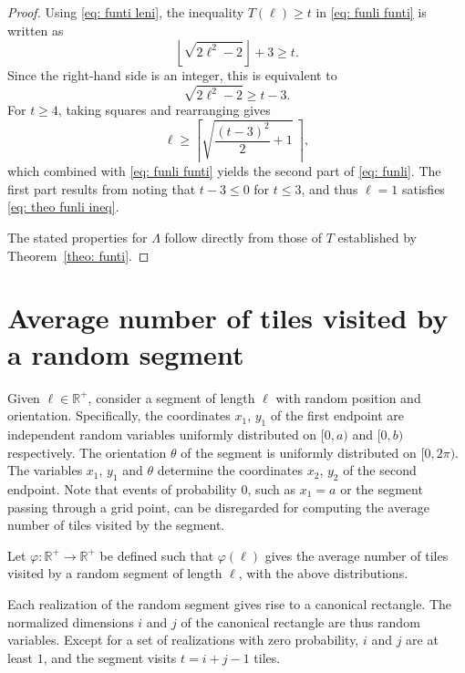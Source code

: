 \documentclass[12pt, a4paper]{article}
\newcommand{\funti}{T} %
\newcommand{\funli}{\Lambda} %
\newcommand{\funta}{\varphi} %
\newcommand{\len}{\ell} %
\newcommand{\leni}{\ell} %
\newcommand{\tiles}{t} %
\newcommand{\touches}{visits}
\newcommand{\touched}{visited}
\begin{document}
\begin{proof}
Using \eqref{eq: funti leni}, the inequality $\funti(\leni) \geq \tiles$ in \eqref{eq: funli funti} is written as
\begin{equation}
\left\lfloor \sqrt{2\leni^2-2} \right\rfloor + 3 \geq \tiles.
\end{equation}
Since the right-hand side is an integer, this is equivalent to
\begin{equation}
\label{eq: theo funli ineq}
\sqrt{2\leni^2-2} \geq \tiles-3.
\end{equation}
For $\tiles \geq 4$, taking squares and rearranging gives
\begin{equation}
\leni \geq \left \lceil \sqrt{\frac{(\tiles-3)^2} 2 + 1} \ \right \rceil,
\end{equation}
which combined with \eqref{eq: funli funti} yields the second part of \eqref{eq: funli}. The first part results from noting that $\tiles-3 \leq 0$ for $\tiles \leq 3$, and thus $\leni=1$ satisfies \eqref{eq: theo funli ineq}.

The stated properties for $\funli$ follow directly from those of $\funti$ established by Theorem~\ref{theo: funti}.
\end{proof}


\section{Average number of tiles \touched{} by a random segment}
\label{part: ave}

Given $\len \in \mathbb R^+$, consider a segment of length $\len$ with random position and orientation. Specifically, the coordinates $x_1$, $y_1$ of the first endpoint are independent random variables uniformly distributed on $[0,a)$ and $[0,b)$ respectively. The orientation $\theta$ of the segment is uniformly distributed on $[0,2\pi)$. The variables $x_1$, $y_1$ and $\theta$ determine the coordinates $x_2$, $y_2$ of the second endpoint. Note that events of probability $0$, such as $x_1=a$ or the segment passing through a grid point, can be disregarded for computing the average number of tiles \touched{} by the segment.

Let $\funta: \mathbb R^+ \to \mathbb R^+$ be defined such that $\funta(\len)$ gives the average number of tiles \touched{} by a random segment of length $\len$, with the above distributions.

Each realization of the random segment gives rise to a canonical rectangle. The normalized dimensions $i$ and $j$ of the canonical rectangle are thus random variables. Except for a set of realizations with zero probability, $i$ and $j$ are at least $1$, and the segment \touches{} $t = i+j-1$ tiles.
\end{document}

